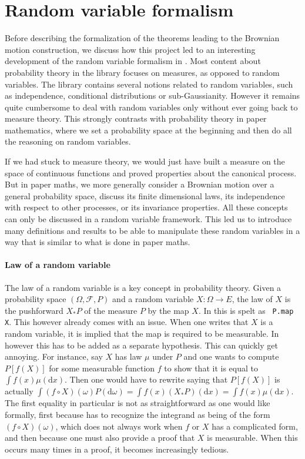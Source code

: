 \documentclass[lean]{Draft}
\renewcommand{\lean}[1]{\lstinline| #1|}
\begin{document}
\section{Random variable formalism}
\label{S:RV-formalism}

Before describing the formalization of the theorems leading to the Brownian motion construction, we discuss how this project led to an interesting development of the random variable formalism in \mathlib. Most content about probability theory in the library focuses on measures, as opposed to random variables.
The library contains several notions related to random variables, such as independence, conditional distributions or sub-Gaussianity. However it remains quite cumbersome to deal with random variables only without ever going back to measure theory. This strongly contrasts with probability theory in paper mathematics, where we set a probability space at the beginning and then do all the reasoning on random variables.

If we had stuck to measure theory, we would just have built a measure on the space of continuous functions and proved properties about the canonical process. But in paper maths, we more generally consider a Brownian motion over a general probability space, discuss its finite dimensional laws, its independence with respect to other processes, or its invariance properties. All these concepts can only be discussed in a random variable framework. This led us to introduce many definitions and results to be able to manipulate these random variables in a way that is similar to what is done in paper maths.

\paragraph{Law of a random variable}

The law of a random variable is a key concept in probability theory. Given a probability space $(\Omega, \mathcal{F}, P)$ and a random variable $X : \Omega \to E$, the law of $X$ is the pushforward $X_*P$ of the measure $P$ by the map $X$. In \Lean this is spelt as \lean{P.map X}. This however already comes with an issue. When one writes that $X$ is a random variable, it is implied that the map is required to be measurable. In \Lean however this has to be added as a separate hypothesis.
This can quickly get annoying.
For instance, say $X$ has law $\mu$ under $P$ and one wants to compute $P[f(X)]$ for some measurable function $f$ to show that it is equal to $\int f(x) \mu(\mathrm dx)$. Then one would have to rewrite saying that $P[f(X)]$ is actually $\int (f \circ X)(\omega) P(\mathrm d\omega) = \int f(x) (X_*P)(\mathrm dx) = \int f(x) \mu(\mathrm dx)$. The first equality in particular is not as straightforward as one would like formally, first because \Lean has to recognize the integrand as being of the form $(f \circ X)(\omega)$, which does not always work when $f$ or $X$ has a complicated form,
and then because one must also provide a proof that $X$ is measurable.
When this occurs many times in a proof, it becomes increasingly tedious.
\end{document}
